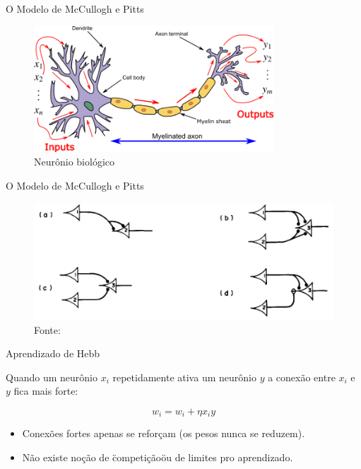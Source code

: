 \documentclass{beamer}
\theoremstyle{definition}
\begin{document}
\begin{frame}{O Modelo de McCullogh e Pitts}

  \begin{figure}[t]
    \includegraphics[width=0.8\textwidth]{neuron3.png}
    \caption{Neurônio biológico}
    \centering
  \end{figure}

\end{frame}

\begin{frame}{O Modelo de McCullogh e Pitts}

  \begin{figure}[t]
    \includegraphics[width=\textwidth]{neuron1.png}
    \caption{Fonte: \cite{mcculloch1943logical}}
    \centering
  \end{figure}

\end{frame}

\begin{frame}{Aprendizado de Hebb}

  Quando um neurônio $x_i$ repetidamente ativa um neurônio $y$ a
  conexão entre $x_i$ e $y$ fica mais forte:

  \[ w_{i} = w_{i} + \eta x_i y \]

  \pause

  \begin{itemize}
    \item Conexões fortes apenas se reforçam (os pesos nunca se reduzem).
    \item Não existe noção de \"competição\" ou de limites pro aprendizado.
  \end{itemize}

\end{frame}
\end{document}
